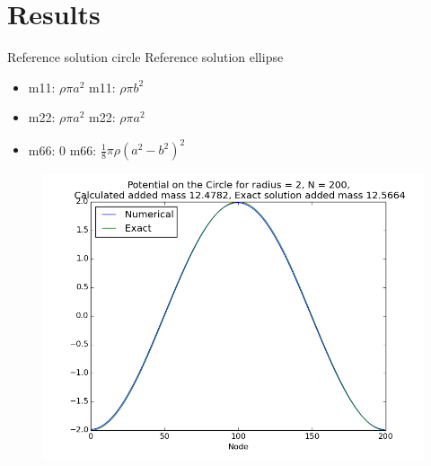 \documentclass[a4paper,norsk]{article}
\begin{document}
\newpage
\section*{Results}
Reference solution circle \hspace{2cm} Reference solution ellipse
\begin{itemize}
\item m11: $\rho \pi a^2$   \hspace{3.3cm}    m11: $\rho \pi b^2$
\item m22: $\rho \pi  a^2$  \hspace{3.3cm}    m22: $\rho \pi a^2$
\item m66: 0                \hspace{3.8cm}    m66: $\frac{1}{8}\pi \rho (a^2 - b^2)^2 $  
\end{itemize}

\begin{figure}[h!]	
	\centering
	\includegraphics[scale=0.6]{present1.png}
\end{figure}
\end{document}
